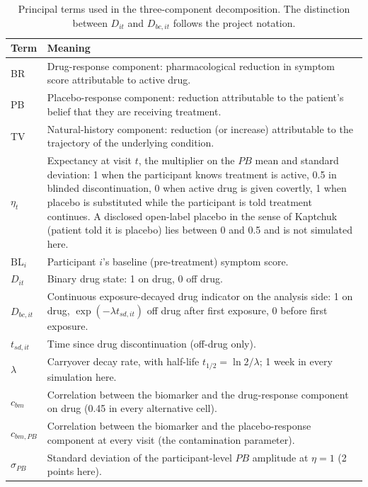 \documentclass[
  11pt,
]{article}
\begin{document}
\begin{table}

\caption{\label{tab:terms}Principal terms used in the three-component decomposition. The distinction between $D_{it}$ and $D_{bc,it}$ follows the project notation.}
\centering
\begin{tabular}[t]{ll}
\toprule
Term & Meaning\\
\midrule
BR & Drug-response component: pharmacological reduction in symptom score attributable to active drug.\\
PB & Placebo-response component: reduction attributable to the patient's belief that they are receiving treatment.\\
TV & Natural-history component: reduction (or increase) attributable to the trajectory of the underlying condition.\\
$\eta_t$ & Expectancy at visit $t$, the multiplier on the $PB$ mean and standard deviation: 1 when the participant knows treatment is active, 0.5 in blinded discontinuation, 0 when active drug is given covertly, 1 when placebo is substituted while the participant is told treatment continues. A disclosed open-label placebo in the sense of Kaptchuk (patient told it is placebo) lies between 0 and 0.5 and is not simulated here.\\
$\mathrm{BL}_i$ & Participant $i$'s baseline (pre-treatment) symptom score.\\
\addlinespace
$D_{it}$ & Binary drug state: 1 on drug, 0 off drug.\\
$D_{bc,it}$ & Continuous exposure-decayed drug indicator on the analysis side: 1 on drug, $\exp(-\lambda t_{sd,it})$ off drug after first exposure, 0 before first exposure.\\
$t_{sd,it}$ & Time since drug discontinuation (off-drug only).\\
$\lambda$ & Carryover decay rate, with half-life $t_{1/2} = \ln 2 / \lambda$; 1 week in every simulation here.\\
$c_{bm}$ & Correlation between the biomarker and the drug-response component on drug (0.45 in every alternative cell).\\
\addlinespace
$c_{bm,PB}$ & Correlation between the biomarker and the placebo-response component at every visit (the contamination parameter).\\
$\sigma_{PB}$ & Standard deviation of the participant-level $PB$ amplitude at $\eta = 1$ (2 points here).\\
\bottomrule
\end{tabular}
\end{table}
\end{document}
